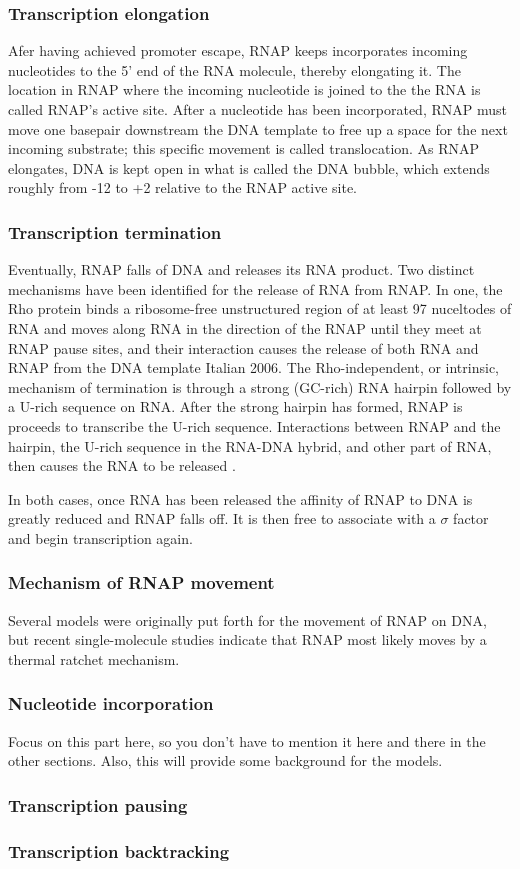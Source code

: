 \subsubsection{Transcription elongation}
Afer having achieved promoter escape, RNAP keeps incorporates incoming
nucleotides to the 5' end of the RNA molecule, thereby elongating it. The
location in RNAP where the incoming nucleotide is joined to the the RNA is
called RNAP's active site. After a nucleotide has been incorporated, RNAP must
move one basepair downstream the DNA template to free up a space for the next
incoming substrate; this specific movement is called translocation. As RNAP
elongates, DNA is kept open in what is called the DNA bubble, which extends
roughly from -12 to +2 relative to the RNAP active site.

\subsubsection{Transcription termination}
Eventually, RNAP falls of DNA and releases its RNA product. Two distinct
mechanisms have been identified for the release of RNA from RNAP. In one, the Rho
protein binds a ribosome-free unstructured region of at least 97 nuceltodes of
RNA and moves along RNA in the direction of the RNAP until they meet at RNAP
pause sites, and their interaction causes the release of both RNA and RNAP from
the DNA template \cite{ciampi_rho-dependent_2006} Italian 2006. The
Rho-independent, or intrinsic, mechanism of termination is through a strong
(GC-rich) RNA hairpin followed by a U-rich sequence on RNA. After the strong
hairpin has formed, RNAP is proceeds to transcribe the U-rich sequence.
Interactions between RNAP and the hairpin, the U-rich sequence in the RNA-DNA
hybrid, and other part of RNA, then causes the RNA to be released
\cite{nudler_transcription_2002}.

In both cases, once RNA has been released the affinity of RNAP to DNA is
greatly reduced and RNAP falls off. It is then free to associate with a
$\sigma$ factor and begin transcription again.

\subsubsection{Mechanism of RNAP movement}
Several models were originally put forth for the movement of RNAP on DNA, but
recent single-molecule studies indicate that RNAP most likely moves by a
thermal ratchet mechanism.

\subsubsection{Nucleotide incorporation}
Focus on this part here, so you don't have to mention it here and there in the
other sections. Also, this will provide some background for the models.

\subsubsection{Transcription pausing}

\subsubsection{Transcription backtracking}
